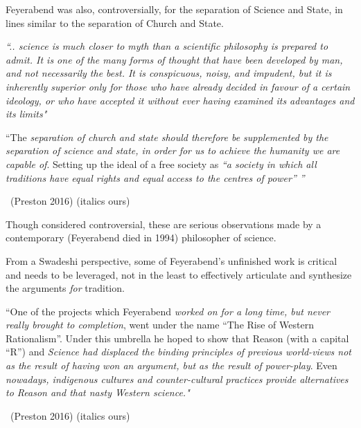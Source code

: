 \vskip 2pt

Feyerabend was also, controversially, for the separation of Science and State, in lines similar to the separation of Church and State.

\vskip 2pt

\begin{myquote}
\textit{“.. science is much closer to myth than a scientific philosophy is prepared to admit. It is one of the many forms of thought that have been developed by man, and not necessarily the best. It is conspicuous, noisy, and impudent, but it is inherently superior only for those who have already decided in favour of a certain ideology, or who have accepted it without ever having examined its advantages and its limits"}
\end{myquote}

\vskip 2pt

\begin{myquote}
“The \textit{separation of church and state should therefore be supplemented by the separation of science and state, in order for us to achieve the humanity we are capable of}. Setting up the ideal of a free society as \textit{“a society in which all traditions have equal rights and equal access to the centres of power” ”} 

~\hfill (Preston 2016) (italics ours)
\end{myquote}

\vskip 2pt

Though considered controversial, these are serious observations made by a contemporary (Feyerabend died in 1994) philosopher of science.

\vskip 2pt

From a Swadeshi perspective, some of Feyerabend’s unfinished work is critical and needs to be leveraged, not in the least to effectively articulate and synthesize the arguments \textit{for} tradition.

\vskip 2pt

\begin{myquote}
“One of the projects which Feyerabend \textit{worked on for a long time, but never really brought to completion}, went under the name “The Rise of Western Rationalism”. Under this umbrella he hoped to show that Reason (with a capital “R”) and \textit{Science had displaced the binding principles of previous world-views not as the result of having won an argument, but as the result of power-play}. Even \textit{nowadays, indigenous cultures and counter-cultural practices provide alternatives to Reason and that nasty Western science."} 

~\hfill (Preston 2016) (italics ours)
\end{myquote}

